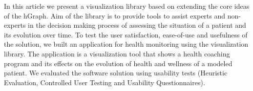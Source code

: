 \documentclass[twocolumn]{bmcart}%
\begin{document}

 
In this article we present a visualization library based on extending the core ideas of the hGraph. Aim of the library is to provide tools to assist experts and non-experts in the decision making process of assessing the situation of a patient and its evolution over time. To test the user satisfaction, ease-of-use and usefulness of the solution, we built an application for health monitoring using the visualization library. The application is a visualization tool that shows a health coaching program and its effects on the evolution of health and wellness of a modeled patient. We evaluated the software solution using usability tests (Heuristic Evaluation, Controlled User Testing and Usability Questionnaires).  

\end{document}

